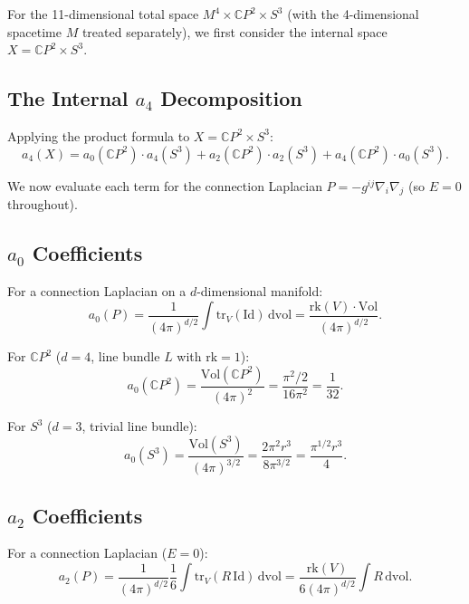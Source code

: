 \documentclass[12pt,a4paper]{article}
\begin{document}
For the 11-dimensional total space $M^4 \times \mathbb{C}P^2 \times S^3$
(with the 4-dimensional spacetime $M$ treated separately), we first consider
the internal space $X = \mathbb{C}P^2 \times S^3$.

\subsection{The Internal $a_4$ Decomposition}

Applying the product formula to $X = \mathbb{C}P^2 \times S^3$:
\begin{equation}\label{eq:a4-decomposition}
\boxed{
a_4(X) = a_0(\mathbb{C}P^2) \cdot a_4(S^3)
+ a_2(\mathbb{C}P^2) \cdot a_2(S^3)
+ a_4(\mathbb{C}P^2) \cdot a_0(S^3).
}
\end{equation}

We now evaluate each term for the connection Laplacian
$P = -g^{ij}\nabla_i\nabla_j$ (so $E = 0$ throughout).

\subsection{$a_0$ Coefficients}

For a connection Laplacian on a $d$-dimensional manifold:
\begin{equation}
a_0(P) = \frac{1}{(4\pi)^{d/2}} \int \mathrm{tr}_V(\mathrm{Id})\,\mathrm{dvol}
= \frac{\mathrm{rk}(V) \cdot \mathrm{Vol}}{(4\pi)^{d/2}}.
\end{equation}

For $\mathbb{C}P^2$ ($d = 4$, line bundle $L$ with $\mathrm{rk} = 1$):
\begin{equation}\label{eq:a0-CP2}
a_0(\mathbb{C}P^2) = \frac{\mathrm{Vol}(\mathbb{C}P^2)}{(4\pi)^2}
= \frac{\pi^2/2}{16\pi^2} = \frac{1}{32}.
\end{equation}

For $S^3$ ($d = 3$, trivial line bundle):
\begin{equation}\label{eq:a0-S3}
a_0(S^3) = \frac{\mathrm{Vol}(S^3)}{(4\pi)^{3/2}}
= \frac{2\pi^2 r^3}{8\pi^{3/2}}
= \frac{\pi^{1/2} r^3}{4}.
\end{equation}

\subsection{$a_2$ Coefficients}

For a connection Laplacian ($E = 0$):
\begin{equation}
a_2(P) = \frac{1}{(4\pi)^{d/2}} \frac{1}{6}
\int \mathrm{tr}_V(R\,\mathrm{Id})\,\mathrm{dvol}
= \frac{\mathrm{rk}(V)}{6(4\pi)^{d/2}} \int R\,\mathrm{dvol}.
\end{equation}
\end{document}

